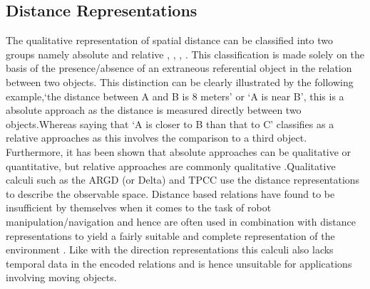 		\subsection{Distance Representations} The qualitative representation of spatial distance can be classified into two groups namely absolute and relative \cite{isli2000new}, \cite{chen2015survey}, \cite{cohn2001qualitative}, \cite{isli2001combining}. This classification is made solely on the basis of  the presence/absence of an extraneous referential object in the relation between two objects. This distinction can be clearly illustrated by the following example,`the distance between A and B is 8 meters' or `A is near B', this is a absolute approach as the distance is measured directly between two objects.Whereas saying that `A is closer to B than that to C' classifies as a relative approaches as this involves the comparison to a third object. Furthermore, it has been shown that absolute approaches	can be qualitative or quantitative, but relative approaches are commonly qualitative \cite{cohn2001qualitative}.Qualitative calculi such as the ARGD (or Delta) and TPCC use the distance representations to describe the observable space. Distance based relations have found to be insufficient by themselves when it comes to the task of robot manipulation/navigation and hence are often used in combination with distance representations to yield a fairly suitable and complete representation of the environment \cite{chen2015survey}. Like with the direction representations this calculi also lacks temporal data in the encoded relations and is hence unsuitable for applications involving moving objects.
		
